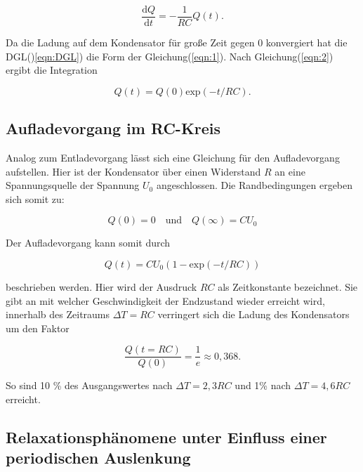         \begin{equation}
            \frac{\text{d}Q}{\text{d}t} = - \frac{1}{RC} Q(t).
            \label{eqn:DGL}
        \end{equation}

        \noindent Da die Ladung auf dem Kondensator für große Zeit gegen 0 konvergiert hat die DGL()\ref{eqn:DGL}) die Form der 
        Gleichung(\ref{eqn:1}). Nach Gleichung(\ref{eqn:2}) ergibt die Integration

        \begin{equation*}
            Q(t) = Q(0) \text{exp}(-t/RC).
        \end{equation*}

    \subsection{Aufladevorgang im RC-Kreis}

        \noindent Analog zum Entladevorgang lässt sich eine Gleichung für den Aufladevorgang aufstellen. Hier ist der Kondensator über einen 
        Widerstand $R$ an eine Spannungsquelle der Spannung $U_0$ angeschlossen. Die Randbedingungen ergeben sich somit zu:
    
        \begin{equation*}
            Q(0) = 0 \quad \text{und} \quad Q(\infty) = CU_0 
        \end{equation*}

        \noindent Der Aufladevorgang kann somit durch 

        \begin{equation*}
            Q(t) = CU_0(1- \text{exp}(-t/RC))
        \end{equation*}

        \noindent beschrieben werden. Hier wird der Ausdruck $RC$ als Zeitkonstante bezeichnet. Sie gibt an mit welcher Geschwindigkeit der 
        Endzustand wieder erreicht wird, innerhalb des Zeitraums $\Delta T = RC$ verringert sich die Ladung des Kondensators um den Faktor

        \begin{equation*}
            \frac{Q(t = RC)}{Q(0)} = \frac{1}{e} \approx 0,368 .
        \end{equation*}

        \noindent So sind 10 \% des Ausgangswertes nach $\Delta T = 2,3RC$ und 1\% nach $\Delta T = 4,6RC$ erreicht.

    \subsection{Relaxationsphänomene unter Einfluss einer periodischen Auslenkung}

